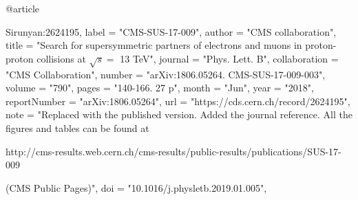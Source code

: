@article{Sirunyan:2624195,
      label          = "CMS-SUS-17-009",
      author        = "{CMS collaboration}",
      title         = "{Search for supersymmetric partners of electrons and muons
                       in proton-proton collisions at $\sqrt{s}=$ 13 TeV}",
      journal       = "Phys. Lett. B",
      collaboration = "CMS Collaboration",
      number        = "arXiv:1806.05264. CMS-SUS-17-009-003",
      volume        = "790",
      pages         = "140-166. 27 p",
      month         = "Jun",
      year          = "2018",
      reportNumber  = "arXiv:1806.05264",
      url           = "https://cds.cern.ch/record/2624195",
      note          = "Replaced with the published version. Added the journal
                       reference. All
  the figures and tables can be found at
 
                       http://cms-results.web.cern.ch/cms-results/public-results/publications/SUS-17-009

                        (CMS Public Pages)",
      doi           = "10.1016/j.physletb.2019.01.005",
}

